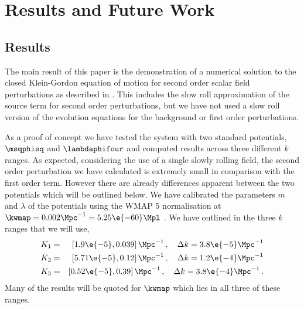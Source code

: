 \renewcommand{\CVSrevision}{\version$Id: results.tex,v 1.2 2009/10/05 11:17:43 ith Exp $}

\chapter{Results and Future Work}
\label{ch:results}


\section{Results}
\label{sec:results}


The main result of this paper is the demonstration of a numerical solution to
the closed Klein-Gordon equation of motion for second order scalar field
perturbations as described in . This includes the slow
roll approximation of the source term for second order perturbations, but we
have not used a slow
roll version of the evolution equations for the background or first order
perturbations. 

As a proof of concept we have tested the system with two standard potentials,
$\msqphisq$ and $\lambdaphifour$ and computed results across three
different $k$ ranges. As expected, considering the use of a single slowly
rolling field, the second order perturbation we have calculated is extremely
small in comparison with the first order term. However there are already
differences apparent between the two potentials which will be outlined below.
We have calibrated the parameters $m$ and $\lambda$ of the potentials using the
WMAP 5 normalisation at $\kwmap=0.002 \Mpc^{-1} = 5.25 \e{-60}\Mpl$
\cite{Komatsu:2008hk}.
We have outlined in  the three $k$ ranges that we will use,
% 
\begin{eqnarray*}
K_1 &=& \left[1.9\e{-5}, 0.039\right]\Mpc^{-1}\,,\quad \Delta k =
3.8\e{-5}\Mpc^{-1} \nonumber\\
K_2 &=& \left[5.71\e{-5}, 0.12\right]\Mpc^{-1}\,, \quad \Delta k =
1.2\e{-4}\Mpc^{-1}
\nonumber\\ 
K_3 &=& \left[0.52\e{-5}, 0.39\right]\Mpc^{-1}\,, \quad \Delta k =
3.8\e{-4}\Mpc^{-1} \,.
\end{eqnarray*}
Many of the results will be quoted for $\kwmap$ which lies in all three of these
ranges.

